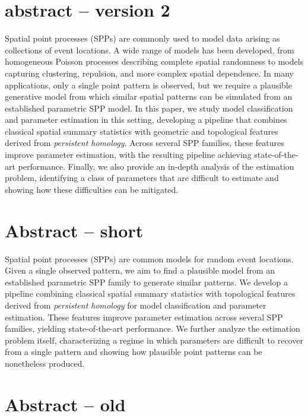 \documentclass[11pt]{article}
\begin{document}
\section{abstract -- version 2}
Spatial point processes (SPPs) are commonly used to model data arising as collections of event locations. A wide range of models has been developed, from homogeneous Poisson processes describing complete spatial randomness to models capturing clustering, repulsion, and more complex spatial dependence. In many applications, only a single point pattern is observed, but we require a plausible generative model from which similar spatial patterns can be simulated from an established parametric SPP model. In this paper, we study model classification and parameter estimation in this setting, developing a pipeline that combines classical spatial summary statistics with geometric and topological features derived from \emph{persistent homology}. Across several SPP families, these features improve parameter estimation, with the resulting pipeline achieving state-of-the-art performance. Finally, we also provide an in-depth analysis of the estimation problem, identifying a class of parameters that are difficult to estimate and showing how these difficulties can be mitigated.

\section{Abstract -- short}
Spatial point processes (SPPs) are common models for random event locations. Given a single observed pattern, we aim to find a plausible model from an established parametric SPP family to generate similar patterns. We develop a pipeline combining classical spatial summary statistics with topological features derived from \emph{persistent homology} for model classification and parameter estimation. These features improve parameter estimation across several SPP families, yielding state-of-the-art performance. 
We further analyze the estimation problem itself, characterizing a regime in which parameters are difficult to recover from a single pattern and showing how plausible point patterns can be nonetheless produced. 


\section{Abstract -- old}
\vspace{2cm}
\end{document}
